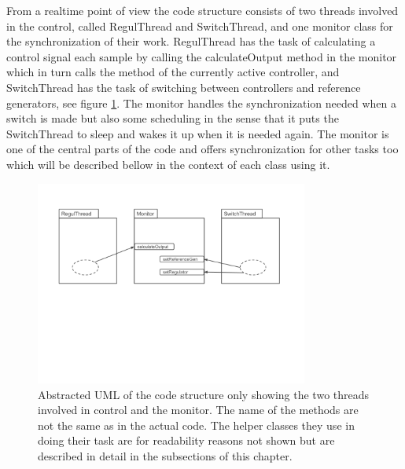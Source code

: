 
From a realtime point of view the code structure consists of two threads involved in the control, called RegulThread and SwitchThread, and one monitor class for the synchronization of their work. RegulThread has the task of calculating a control signal each sample by calling the calculateOutput method in the monitor which in turn calls the method of the currently active controller, and SwitchThread has the task of switching between controllers and reference generators, see figure \ref{overall_fig}. The monitor handles the synchronization needed when a switch is made but also some scheduling in the sense that it puts the SwitchThread to sleep and wakes it up when it is needed again. The monitor is one of the central parts of the code and offers synchronization for other tasks too which will be described bellow in the context of each class using it. 
\begin{figure}
\centering
\includegraphics[width=0.8\textwidth]{figures/Overall.png}
\caption{Abstracted UML of the code structure only showing the two threads involved in control and the monitor. The name of the methods are not the same as in the actual code. The helper classes they use in doing their task are for readability reasons not shown but are described in detail in the subsections of this chapter.}
\label{overall_fig}
\end{figure}

